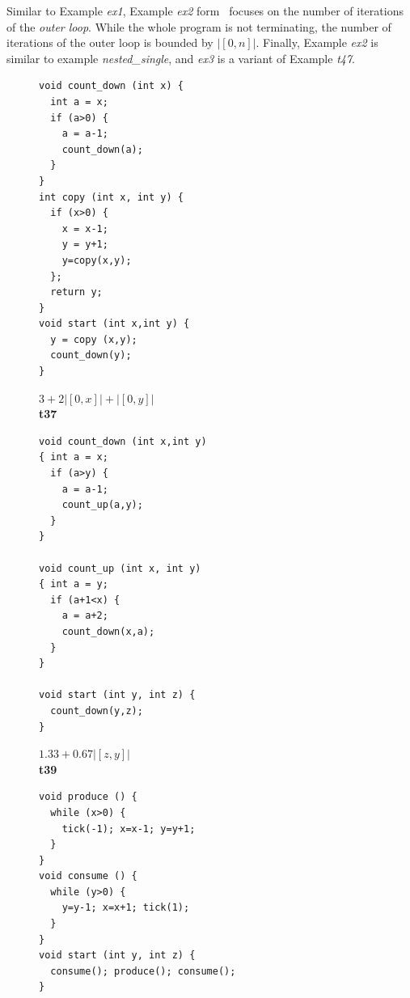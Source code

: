 \documentclass[nocopyrightspace,preprint,pldi]{sigplanconf-pldi15}
\begin{document}
{Similar to Example \emph{ex1}, Example \emph{ex2}
form~\cite{GulwaniZ10} focuses on the number of iterations of the
\emph{outer loop}.  While the whole program is not terminating, the
number of iterations of the outer loop is bounded by $|[0,n]|$.
Finally, Example \emph{ex2} is similar to example
\emph{nested\_single}, and \emph{ex3} is a variant of Example
\emph{t47}.

\begin{figure}
 \setlength{\progwidth}{.28\linewidth}
  \centering
%
%
  \begin{minipage}[b]{\progwidth}
    \begin{center}
   \begin{lstlisting}
void count_down (int x) {
  int a = x;
  if (a>0) {
    a = a-1;
    count_down(a);
  }
}
int copy (int x, int y) {
  if (x>0) {
    x = x-1;
    y = y+1;
    y=copy(x,y);
  };
  return y;
}
void start (int x,int y) {
  y = copy (x,y);
  count_down(y);
}
   \end{lstlisting}

$3 + 2|[0, x]| + |[0, y]|$
\\[.7\baselineskip]
      {\bf t37}
    \end{center}
  \end{minipage}
%
%
  \begin{minipage}[b]{\progwidth}
    \begin{center}
   \begin{lstlisting}
void count_down (int x,int y)
{ int a = x;
  if (a>y) {
    a = a-1;
    count_up(a,y);
  }
}

void count_up (int x, int y)
{ int a = y;
  if (a+1<x) {
    a = a+2;
    count_down(x,a);
  }
}

void start (int y, int z) {
  count_down(y,z);
}
   \end{lstlisting}

$1.33 + 0.67 |[z,y]|$
\\[.7\baselineskip]
      {\bf t39}
    \end{center}
  \end{minipage}
%
%
  \begin{minipage}[b]{\progwidth}
    \begin{center}
   \begin{lstlisting}
void produce () {
  while (x>0) {
    tick(-1); x=x-1; y=y+1;
  }
}
void consume () {
  while (y>0) {
    y=y-1; x=x+1; tick(1);
  }
}
void start (int y, int z) {
  consume(); produce(); consume();
}
   \end{lstlisting}


\end{center}
\end{minipage}
\end{figure}}
\end{document}
